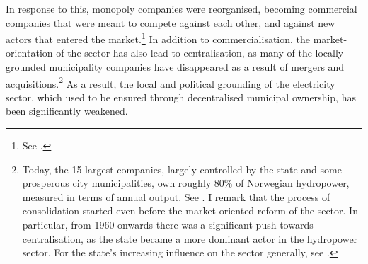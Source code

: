 In response to this, monopoly companies were reorganised, becoming commercial companies that were meant to compete against each other, and against new actors that entered the market.\footnote{See \cite{claes11}.} %
In addition to commercialisation, the market-orientation of the sector has also lead to centralisation, as many of the locally grounded municipality companies have disappeared as a result of mergers and acquisitions.\footnote{Today, the 15 largest companies, largely controlled by the state and some prosperous city municipalities, own roughly 80\% of Norwegian hydropower, measured in terms of annual output. See \cite[28]{otprp61}. I remark that the process of consolidation started even before the market-oriented reform of the sector. In particular, from 1960 onwards there was a significant push towards centralisation, as the state became a more dominant actor in the hydropower sector. For the state's increasing influence on the sector generally, see \cite{skjold06,thue06b}.} As a result, the local and political grounding of the electricity sector, which used to be ensured through decentralised municipal ownership, has been significantly weakened.

